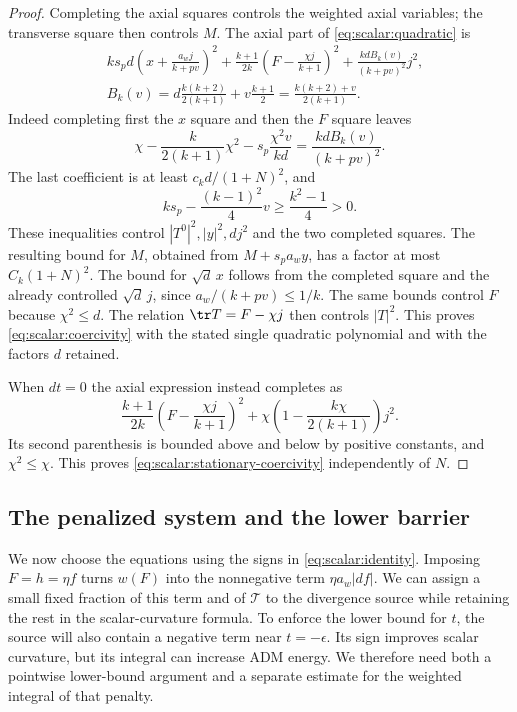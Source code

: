 \begin{proof}
Completing the axial squares controls the weighted axial variables;
the transverse square then controls $M$.  The axial part of
\eqref{eq:scalar:quadratic} is
\begin{equation}
 \begin{aligned}
 &ks_pd\left(x+\frac{a_wj}{k+pv}\right)^2
 +\frac{k+1}{2k}\left(F-\frac{\chi j}{k+1}\right)^2
 +\frac{kd B_k(v)}{(k+pv)^2}j^2,\\
 &B_k(v)=d\frac{k(k+2)}{2(k+1)}+v\frac{k+1}{2}
        =\frac{k(k+2)+v}{2(k+1)}.
 \end{aligned}
 \label{eq:scalar:completed-axial}
\end{equation}
Indeed completing first the $x$ square and then the $F$ square leaves
\[
 \chi-\frac{k}{2(k+1)}\chi^2
             -s_p\frac{\chi^2v}{kd}
       =\frac{kd B_k(v)}{(k+pv)^2}.
\]
The last coefficient is at least $c_kd/(1+N)^2$, and
\[
 ks_p-\frac{(k-1)^2}{4}v\geq\frac{k^2-1}{4}>0.
\]
These inequalities control $|T^0|^2,|y|^2,dj^2$ and the two completed
squares.  The resulting bound for $M$, obtained from $M+s_pa_wy$,
has a factor at most $C_k(1+N)^2$.  The bound for $\sqrt d\,x$
follows from the completed square and the already controlled
$\sqrt d\,j$, since $a_w/(k+pv)\leq1/k$.  The same bounds
control $F$ because $\chi^2\leq d$.  The relation
$\tr T=F-\chi j$ then controls $|T|^2$.  This proves
\eqref{eq:scalar:coercivity} with the stated single quadratic
polynomial and with the factors $d$ retained.

When $dt=0$ the axial expression instead completes as
\[
 \frac{k+1}{2k}\left(F-\frac{\chi j}{k+1}\right)^2
       +\chi\left(1-\frac{k\chi}{2(k+1)}\right)j^2.
\]
Its second parenthesis is bounded above and below by positive
constants, and $\chi^2\leq\chi$.  This proves
\eqref{eq:scalar:stationary-coercivity} independently of $N$.
\end{proof}

\subsection{The penalized system and the lower barrier}

We now choose the equations using the signs in
\eqref{eq:scalar:identity}.  Imposing $F=h=\eta f$ turns
$w(F)$ into the nonnegative term $\eta a_w|df|$.  We can assign a
small fixed fraction of this term and of $\mathcal T$ to the divergence
source while retaining the rest in the scalar-curvature formula.
To enforce the lower bound for $t$, the source will also contain a
negative term near $t=-\epsilon$.  Its sign improves scalar curvature,
but its integral can increase ADM energy.  We therefore need both a
pointwise lower-bound argument and a separate estimate for the weighted
integral of that penalty.

